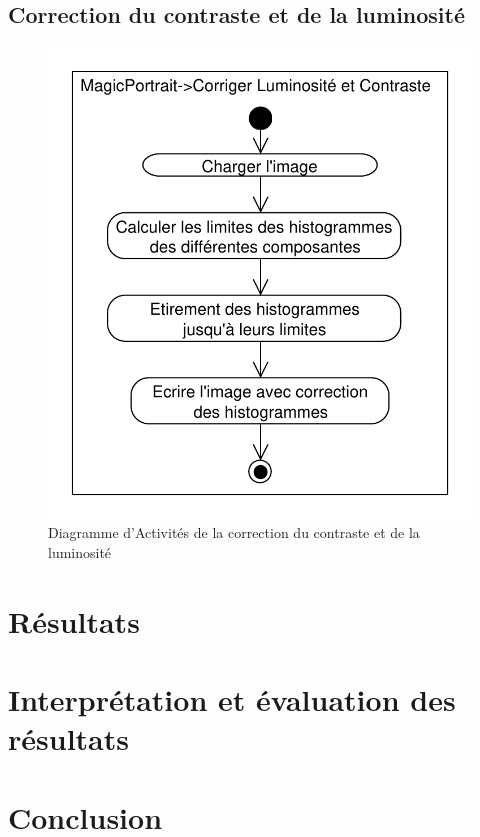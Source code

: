 \documentclass[11pt, french]{report-rd-info}
\begin{document}
\subsection{Correction du contraste et de la luminosité}
\begin{figure}
\centering
\includegraphics[scale=0.5]{Diagrammes/DiagrammeActivites_30_Contraste}
\caption{Diagramme d'Activités de la correction du contraste et de la luminosité}
\label{diag:diagramme30}
\end{figure}

\section{Résultats}


\section{Interprétation et évaluation des résultats}

\section{Conclusion}
\end{document}
